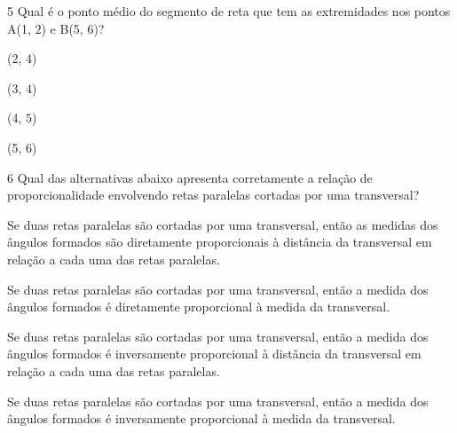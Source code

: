 
\num{5}  Qual é o ponto médio do segmento de reta que tem as extremidades nos
pontos A(1, $2$) e B(5, $6$)?

\begin{escolha}
\item (2, $4$)
\item (3, $4$)
\item (4, $5$)
\item (5, $6$)
\end{escolha}



\num{6}  Qual das alternativas abaixo apresenta corretamente a relação de
proporcionalidade envolvendo retas paralelas cortadas por uma
transversal?

\begin{escolha}
\item Se duas retas paralelas são cortadas por uma transversal, então as
medidas dos ângulos formados são diretamente proporcionais à distância
da transversal em relação a cada uma das retas paralelas.
\item Se duas retas paralelas são cortadas por uma transversal, então a
medida dos ângulos formados é diretamente proporcional à medida da
transversal.
\item Se duas retas paralelas são cortadas por uma transversal, então a
medida dos ângulos formados é inversamente proporcional à distância da
transversal em relação a cada uma das retas paralelas.
\item Se duas retas paralelas são cortadas por uma transversal, então a
medida dos ângulos formados é inversamente proporcional à medida da
transversal.
\end{escolha}

